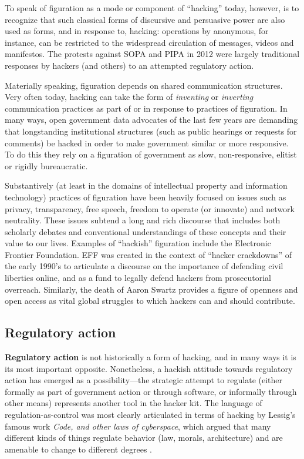 \documentclass[10pt,letter,oneside]{scrartcl}
\begin{document}
To speak of figuration as a mode or component of ``hacking'' today, however, is
to recognize that such classical forms of discursive and persuasive power are
also used as forms, and in response to, hacking: operations by anonymous, for
instance, can be restricted to the widespread circulation of messages, videos
and manifestos. The protests against SOPA and PIPA in 2012 were largely
traditional responses by hackers (and others) to an attempted regulatory 
action.

Materially speaking, figuration depends on shared communication structures. Very
often today, hacking can take the form of \emph{inventing} or \emph{inverting}
communication practices as part of or in response to practices of figuration.
In many ways, open government data advocates of the last few years are demanding
that longstanding institutional structures (such as public hearings or requests
for comments) be hacked in order to make government similar or more responsive.
To do this they rely on a figuration of government as slow, non-responsive,
elitist or rigidly bureaucratic.

Substantively (at least in the domains of intellectual property and information
technology) practices of figuration have been heavily focused on issues such as
privacy, transparency, free speech, freedom to operate (or innovate) and network
neutrality.  These issues subtend a long and rich discourse that includes both
scholarly debates and conventional understandings of these concepts and their
value to our lives.  Examples of ``hackish'' figuration include the Electronic
Frontier Foundation. EFF was created in the context of ``hacker crackdowns'' of
the early 1990's to articulate a discourse on the importance of defending civil
liberties online, and as a fund to legally defend hackers from prosecutorial
overreach.  Similarly, the death of Aaron Swartz provides a figure of openness
and open access as vital global struggles to which hackers can and should
contribute.

\subsection*{Regulatory action}

\textbf{Regulatory action} is not historically a form of hacking, and in many
ways it is its most important opposite.  Nonetheless, a hackish attitude towards
regulatory action has emerged as a possibility---the strategic attempt to
regulate (either formally as part of government action or through software, or
informally through other means) represents another tool in the hacker kit.  The
language of regulation-as-control was most clearly articulated in terms of
hacking by Lessig's famous work \emph{Code, and other laws of cyberspace}, which
argued that many different kinds of things regulate behavior (law, morals,
architecture) and are amenable to change to different degrees
\autocite{lessig2000code}.
\end{document}
